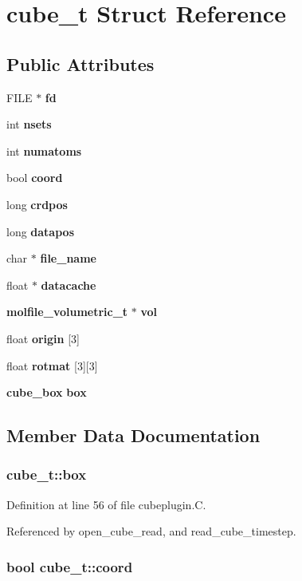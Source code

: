 \section{cube\_\-t  Struct Reference}
\label{structcube__t}
\subsection*{Public Attributes}
\begin{CompactItemize}
\item 
FILE $\ast$ {\bf fd}
\item 
int {\bf nsets}
\item 
int {\bf numatoms}
\item 
bool {\bf coord}
\item 
long {\bf crdpos}
\item 
long {\bf datapos}
\item 
char $\ast$ {\bf file\_\-name}
\item 
float $\ast$ {\bf datacache}
\item 
{\bf molfile\_\-volumetric\_\-t} $\ast$ {\bf vol}
\item 
float {\bf origin} [3]
\item 
float {\bf rotmat} [3][3]
\item 
{\bf cube\_\-box} {\bf box}
\end{CompactItemize}


\subsection{Member Data Documentation}
\subsubsection{ cube\_\-t::box}\label{structcube__t_m11}




Definition at line 56 of file cubeplugin.C.

Referenced by open\_\-cube\_\-read, and read\_\-cube\_\-timestep.
\subsubsection{\setlength{\rightskip}{0pt plus 5cm}bool cube\_\-t::coord}\label{structcube__t_m3}




